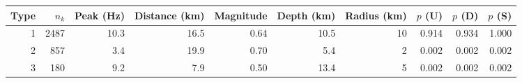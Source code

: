 \begin{tabular}{@{}rrrrrrrrrr@{}}
\toprule
Type & $n_k$ & Peak (Hz) & Distance (km) & Magnitude & Depth (km) & Radius (km) & $p$ (U) & $p$ (D) & $p$ (S) \\
\midrule
1 & 2487 & 10.3 & 16.5 & 0.64 & 10.5 & 10 & 0.914 & 0.934 & 1.000 \\
2 & 857 & 3.4 & 19.9 & 0.70 & 5.4 & 2 & 0.002 & 0.002 & 0.002 \\
3 & 180 & 9.2 & 7.9 & 0.50 & 13.4 & 5 & 0.002 & 0.002 & 0.002 \\
\bottomrule
\end{tabular}
